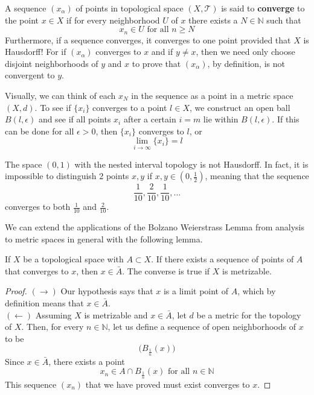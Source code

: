 \documentclass{article}
\begin{document}
  \begin{definition}
  A sequence $(x_\alpha)$ of points in topological space $(X, \mathscr{T})$ is said to \textbf{converge} to the point $x \in X$ if for every neighborhood $U$ of $x$ there exists a $N \in \mathbb{N}$ such that
  \[x_n \in U \text{ for all } n \geq N\]
  Furthermore, if a sequence converges, it converges to one point provided that $X$ is Hausdorff! For if $(x_\alpha)$ converges to $x$ and if $y \neq x$, then we need only choose disjoint neighborhoods of $y$ and $x$ to prove that $(x_\alpha)$, by definition, is not convergent to $y$.
  \end{definition}

  Visually, we can think of each $x_N$ in the sequence as a point in a metric space $(X, d)$. To see if $\{ x_i \}$ converges to a point $l \in X$, we construct an open ball $B(l, \epsilon)$ and see if all points $x_i$ after a certain $i = m$ lie within $B (l, \epsilon)$. If this can be done for all $\epsilon > 0$, then $\{ x_i \}$ converges to $l$, or 
  \[\lim_{i \to \infty} \{ x_i \} = l \]

  \begin{example}
  The space $(0,1)$ with the nested interval topology is not Hausdorff. In fact, it is impossible to distinguish 2 points $x, y$ if $x, y \in (0, \frac{1}{2})$, meaning that the sequence
  \[\frac{1}{10}, \frac{2}{10}, \frac{1}{10}, ...\]
  converges to both $\frac{1}{10}$ and $\frac{2}{10}$.
  \end{example} 

  We can extend the applications of the Bolzano Weierstrass Lemma from analysis to metric spaces in general with the following lemma. 

  \begin{lemma}
  If $X$ be a topological space with $A \subset X$. If there exists a sequence of points of $A$ that converges to $x$, then $x \in \bar{A}$. The converse is true if $X$ is metrizable. 
  \end{lemma}
  \begin{proof}
  $(\rightarrow)$ Our hypothesis says that $x$ is a limit point of $A$, which by definition means that $x \in \bar{A}$. \\
  $(\leftarrow)$ Assuming $X$ is metrizable and $x \in \bar{A}$, let $d$ be a metric for the topology of $X$. Then, for every $n \in \mathbb{N}$, let us define a sequence of open neighborhoods of $x$ to be
  \[\big(B_{\frac{1}{n}} (x) \big)\]
  Since $x \in \bar{A}$, there exists a point 
  \[x_n \in A \cap B_{\frac{1}{n}} (x) \text{ for all } n \in \mathbb{N}\]
  This sequence $(x_n)$ that we have proved must exist converges to $x$. 
  \end{proof}
\end{document}
